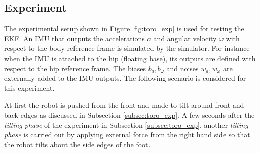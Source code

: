 \subsection{Experiment}
\begin{comment}
\begin{figure}

\caption{Experimental setup for the simple model}
\end{figure}
\end{comment}

The experimental setup shown in Figure \ref{fig:toro_exp} is used for testing the EKF. An IMU that outputs the accelerations $a$ and angular velocity $\omega$ with respect to the body reference frame is simulated by the simulator. For instance when the IMU is attached to the hip (floating base), its outputs are defined with respect to the hip reference frame. The biases $b_a,b_\omega$ and noises $w_a,w_\omega$ are externally added to the IMU outputs. The following scenario is considered for this experiment. 

At first the robot is pushed from the front and made to tilt around front and back edges as discussed in Subsection \ref{subsec:toro_exp}. A few seconds after the \emph{tilting phase} of the experiment in Subsection \ref{subsec:toro_exp}, another \emph{tilting phase} is carried out by applying external force from the right hand side so that the robot tilts about the side edges of the foot. 